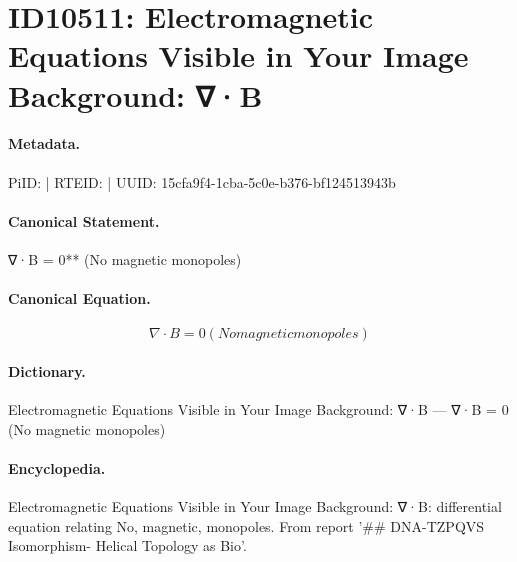 \section*{ID10511: Electromagnetic Equations Visible in Your Image Background: ∇·B}
\paragraph{Metadata.}
PiID:  | RTEID:  | UUID: 15cfa9f4-1cba-5c0e-b376-bf124513943b

\paragraph{Canonical Statement.}
∇·B = 0** (No magnetic monopoles)

\paragraph{Canonical Equation.}
\[
∇·B = 0 (No magnetic monopoles)
\]

\paragraph{Dictionary.}
Electromagnetic Equations Visible in Your Image Background: ∇·B — ∇·B = 0 (No magnetic monopoles)

\paragraph{Encyclopedia.}
Electromagnetic Equations Visible in Your Image Background: ∇·B: differential equation relating No, magnetic, monopoles. From report '\#\# DNA-TZPQVS Isomorphism- Helical Topology as Bio'.
